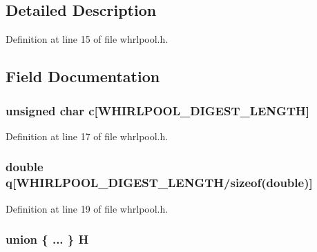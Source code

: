 \begin{DoxyCompactItemize}
\begin{tabbing}
\end{tabbing}\end{DoxyCompactItemize}


\subsection{Detailed Description}


Definition at line 15 of file whrlpool.\+h.



\subsection{Field Documentation}
\subsubsection[{\texorpdfstring{c}{c}}]{\setlength{\rightskip}{0pt plus 5cm}unsigned char c\mbox{[}{\bf W\+H\+I\+R\+L\+P\+O\+O\+L\+\_\+\+D\+I\+G\+E\+S\+T\+\_\+\+L\+E\+N\+G\+TH}\mbox{]}}\hypertarget{struct_w_h_i_r_l_p_o_o_l___c_t_x_a9b61e0784ad7a3f2828b608b27e44411}{}\label{struct_w_h_i_r_l_p_o_o_l___c_t_x_a9b61e0784ad7a3f2828b608b27e44411}


Definition at line 17 of file whrlpool.\+h.

\subsubsection[{\texorpdfstring{q}{q}}]{\setlength{\rightskip}{0pt plus 5cm}double q\mbox{[}{\bf W\+H\+I\+R\+L\+P\+O\+O\+L\+\_\+\+D\+I\+G\+E\+S\+T\+\_\+\+L\+E\+N\+G\+TH}/sizeof(double)\mbox{]}}\hypertarget{struct_w_h_i_r_l_p_o_o_l___c_t_x_abc789205c69c1409ed3b6acca07f8e44}{}\label{struct_w_h_i_r_l_p_o_o_l___c_t_x_abc789205c69c1409ed3b6acca07f8e44}


Definition at line 19 of file whrlpool.\+h.

\subsubsection[{\texorpdfstring{H}{H}}]{\setlength{\rightskip}{0pt plus 5cm}union \{ ... \}   H}\hypertarget{struct_w_h_i_r_l_p_o_o_l___c_t_x_a3cd3cdd445b9358a464eb90ce8f307e3}{}\label{struct_w_h_i_r_l_p_o_o_l___c_t_x_a3cd3cdd445b9358a464eb90ce8f307e3}
